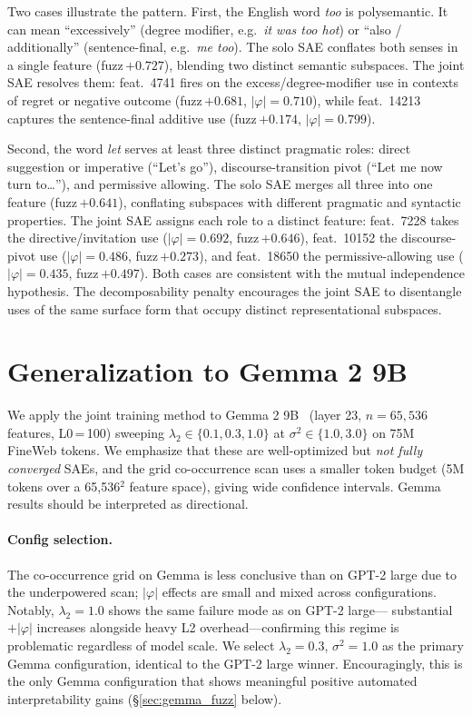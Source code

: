 \documentclass{article} %
\begin{document}
Two cases illustrate the pattern.
First, the English word \textit{too} is polysemantic. It can mean
``excessively'' (degree modifier, e.g.\ \textit{it was too hot}) or
``also / additionally'' (sentence-final, e.g.\ \textit{me too}).
The solo SAE conflates both senses in a single feature (fuzz\,$+0.727$),
blending two distinct semantic subspaces.
The joint SAE resolves them: feat.\ 4741 fires on the excess/degree-modifier
use in contexts of regret or negative outcome (fuzz\,$+0.681$,
$|\varphi|\!=\!0.710$), while feat.\ 14213 captures the sentence-final
additive use (fuzz\,$+0.174$, $|\varphi|\!=\!0.799$).

Second, the word \textit{let} serves at least three distinct pragmatic roles:
direct suggestion or imperative (``Let's go''), discourse-transition pivot
(``Let me now turn to\ldots''), and permissive allowing.
The solo SAE merges all three into one feature (fuzz\,$+0.641$),
conflating subspaces with different pragmatic and syntactic properties.
The joint SAE assigns each role to a distinct feature: feat.\ 7228 takes
the directive/invitation use ($|\varphi|\!=\!0.692$, fuzz\,$+0.646$),
feat.\ 10152 the discourse-pivot use ($|\varphi|\!=\!0.486$,
fuzz\,$+0.273$), and feat.\ 18650 the permissive-allowing use
($|\varphi|\!=\!0.435$, fuzz\,$+0.497$).
Both cases are consistent with the mutual independence hypothesis. The
decomposability penalty encourages the joint SAE to disentangle uses of the
same surface form that occupy distinct representational subspaces.

\section{Generalization to Gemma 2 9B}
\label{sec:gemma}

We apply the joint training method to Gemma 2 9B~\citep{gemma2024} (layer 23,
$n\!=\!65{,}536$ features, L0\,=\,100) sweeping
$\lambda_2 \in \{0.1, 0.3, 1.0\}$ at $\sigma^2 \in \{1.0, 3.0\}$ on 75M FineWeb tokens.
We emphasize that these are well-optimized but \emph{not fully converged} SAEs,
and the grid co-occurrence scan uses a smaller token budget (5M tokens over a
65,536$^2$ feature space), giving wide confidence intervals.
Gemma results should be interpreted as directional.

\paragraph{Config selection.}
The co-occurrence grid on Gemma is less conclusive than on GPT-2 large due to the
underpowered scan; $|\varphi|$ effects are small and mixed across configurations.
Notably, $\lambda_2\!=\!1.0$ shows the same failure mode as on GPT-2 large---
substantial $+|\varphi|$ increases alongside heavy L2 overhead---confirming this
regime is problematic regardless of model scale.
We select $\lambda_2\!=\!0.3$, $\sigma^2\!=\!1.0$ as the primary Gemma
configuration, identical to the GPT-2 large winner.
Encouragingly, this is the only Gemma configuration that shows meaningful positive
automated interpretability gains (\S\ref{sec:gemma_fuzz} below).
\end{document}

